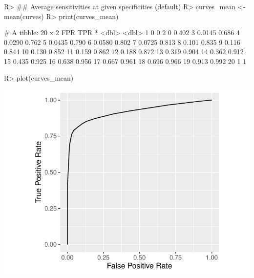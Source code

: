 \documentclass[
]{jss}
\begin{document}
\begin{CodeChunk}
\begin{CodeInput}
R> ## Average sensitivities at given specificities (default)
R> curves_mean <- mean(curves)
R> print(curves_mean)
\end{CodeInput}
\begin{CodeOutput}
# A tibble: 20 x 2
      FPR   TPR
 *  <dbl> <dbl>
 1 0      0    
 2 0      0.402
 3 0.0145 0.686
 4 0.0290 0.762
 5 0.0435 0.790
 6 0.0580 0.802
 7 0.0725 0.813
 8 0.101  0.835
 9 0.116  0.844
10 0.130  0.852
11 0.159  0.862
12 0.188  0.872
13 0.319  0.904
14 0.362  0.912
15 0.435  0.925
16 0.638  0.956
17 0.667  0.961
18 0.696  0.966
19 0.913  0.992
20 1      1    
\end{CodeOutput}
\begin{CodeInput}
R> plot(curves_mean)
\end{CodeInput}


\begin{center}\includegraphics{MRMCaov_files/figure-latex/using_curves_mean_spec-1} \end{center}

\end{CodeChunk}
\end{document}
